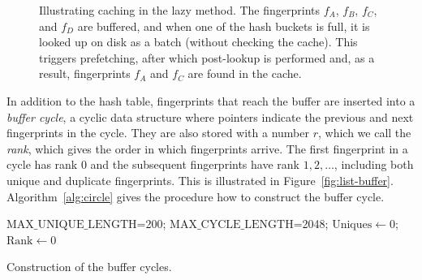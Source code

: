 \documentclass[prodmode,acmtecs]{acmsmall}
\begin{document}
\begin{figure}[htbp]
{
}
\caption{Illustrating caching in the lazy method.  The fingerprints $f_A$, $f_B$, $f_C$, and $f_D$ are buffered, and when one of the hash buckets is full, it is looked up on disk as a batch (without checking the cache).  This triggers prefetching, after which post-lookup is performed and, as a result, fingerprints $f_A$ and $f_C$ are found in the cache.}
\label{fig:cache-lazy}
\end{figure}

In addition to the hash table, fingerprints that reach the buffer are inserted into a \emph{buffer cycle}, a cyclic data structure where pointers indicate the previous and next fingerprints in the cycle.   They are also stored with a number $r$, which we call the \emph{rank}, which gives the order in which fingerprints arrive.  The first fingerprint in a cycle has rank $0$ and the subsequent fingerprints have rank $1,2,\ldots$, including both unique and duplicate fingerprints.  This is illustrated in Figure~\ref{fig:list-buffer}. Algorithm~\ref{alg:circle} gives the procedure how to construct the buffer cycle.

\begin{algorithm}[htbp]
\SetAlgoNoLine
{}
$\mathrm{MAX\_UNIQUE\_LENGTH}$=200; $\mathrm{MAX\_CYCLE\_LENGTH}$=2048; $\mathrm{Uniques} \gets 0$; $\mathrm{Rank} \gets 0$\;
\caption{Construction of the buffer cycles.}
\label{alg:circle}
\end{algorithm}
\end{document}
